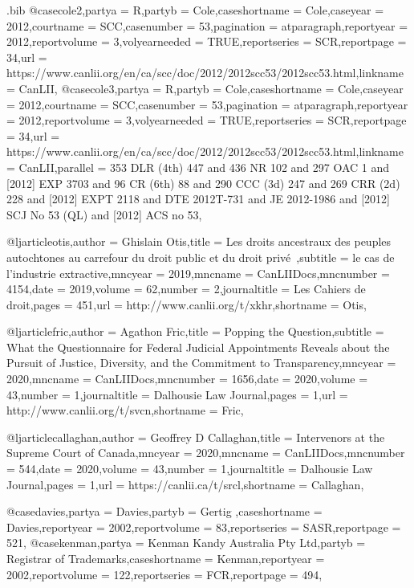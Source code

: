 \begin{filecontents*}[overwrite]{\jobname.bib}
@case{cole2,partya =  {R},partyb =  {Cole},caseshortname =  {Cole},caseyear =  {2012},courtname =  {SCC},casenumber =  {53},pagination =  {atparagraph},reportyear =  {2012},reportvolume =  {3},volyearneeded =  {TRUE},reportseries =  {SCR},reportpage =  {34},url =  {https://www.canlii.org/en/ca/scc/doc/2012/2012scc53/2012scc53.html},linkname =  {CanLII},}
@case{cole3,partya =  {R},partyb =  {Cole},caseshortname =  {Cole},caseyear =  {2012},courtname =  {SCC},casenumber =  {53},pagination =  {atparagraph},reportyear =  {2012},reportvolume =  {3},volyearneeded =  {TRUE},reportseries =  {SCR},reportpage =  {34},url =  {https://www.canlii.org/en/ca/scc/doc/2012/2012scc53/2012scc53.html},linkname =  {CanLII},parallel =  {353 DLR (4th) 447 and 436 NR 102 and 297 OAC 1 and [2012] EXP 3703 and 96 CR (6th) 88 and 290 CCC (3d) 247 and 269 CRR (2d) 228 and [2012] EXPT 2118 and DTE 2012T-731 and JE 2012-1986 and [2012] SCJ No 53 (QL) and [2012] ACS no 53},}

@ljarticle{otis,author =  {Ghislain Otis},title =  {Les droits ancestraux des peuples autochtones au carrefour du droit public et du droit privé~},subtitle =  {le cas de l’industrie extractive},mncyear =  {2019},mncname =  {CanLIIDocs},mncnumber =  {4154},date =  {2019},volume =  {62},number =  {2},journaltitle =  {Les Cahiers de droit},pages =  {451},url =  {http://www.canlii.org/t/xkhr},shortname =  {Otis},}

@ljarticle{fric,author =  {Agathon Fric},title =  {Popping the Question},subtitle =  {What the Questionnaire for Federal Judicial Appointments Reveals about the Pursuit of Justice, Diversity, and the Commitment to Transparency},mncyear =  {2020},mncname =  {CanLIIDocs},mncnumber =  {1656},date =  {2020},volume =  {43},number =  {1},journaltitle =  {Dalhousie Law Journal},pages =  {1},url =  {http://www.canlii.org/t/svcn},shortname =  {Fric},}


@ljarticle{callaghan,author =  {Geoffrey D Callaghan},title =  {Intervenors at the Supreme Court of Canada},mncyear =  {2020},mncname =  {CanLIIDocs},mncnumber =  {544},date =  {2020},volume =  {43},number =  {1},journaltitle =  {Dalhousie Law Journal},pages =  {1},url =  {https://canlii.ca/t/srcl},shortname =  {Callaghan},}


@case{davies,partya =  {Davies},partyb =  {Gertig },caseshortname =  {Davies},reportyear =  {2002},reportvolume =  {83},reportseries =  {SASR},reportpage =  {521},}
@case{kenman,partya =  {Kenman Kandy Australia Pty Ltd},partyb =  {Registrar of Trademarks},caseshortname =  {Kenman},reportyear =  {2002},reportvolume =  {122},reportseries =  {FCR},reportpage =  {494},}


\end{filecontents*}
